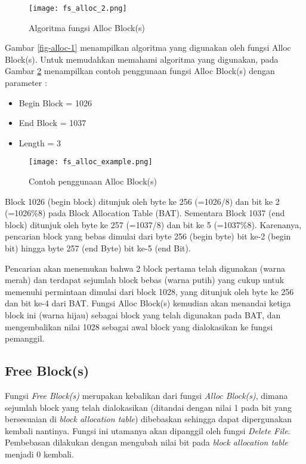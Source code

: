 \documentclass[a4paper, 12pt]{report}
\begin{document}
\begin{figure}
\centering
\texttt{[image: fs\_alloc\_2.png]}
\caption{Algoritma fungsi Alloc Block(s)}
\label{fig-alloc-2}
\end{figure}

Gambar \ref{fig-alloc-1} menampilkan algoritma yang digunakan oleh fungsi Alloc Block(s). Untuk memudahkan memahami algoritma yang digunakan, pada Gambar \ref{fig-alloc-example} menampilkan contoh penggunaan fungsi Alloc Block(s) dengan parameter : 
\begin{itemize}
\item Begin Block = 1026
\item End Block = 1037
\item Length = 3
\end{itemize}


\begin{figure}
\centering
\texttt{[image: fs\_alloc\_example.png]}
\caption{Contoh penggunaan Alloc Block(s)}
\label{fig-alloc-example}
\end{figure}

Block 1026 (begin block) ditunjuk oleh byte ke 256 (=1026/8) dan bit ke 2 (=1026\%8) pada Block Allocation Table (BAT). Sementara Block 1037 (end block) ditunjuk oleh byte ke 257 (=1037/8) dan bit ke 5 (=1037\%8). Karenanya, pencarian block yang bebas dimulai dari byte 256 (begin byte) bit ke-2 (begin bit) hingga byte 257 (end Byte) bit ke-5 (end Bit). 

Pencarian akan menemukan bahwa 2 block pertama telah digunakan (warna merah) dan terdapat sejumlah block bebas (warna putih) yang cukup untuk memenuhi permintaan dimulai dari block 1028, yang ditunjuk oleh byte ke 256 dan bit ke-4 dari BAT. Fungsi Alloc Block(s) kemudian akan menandai ketiga block ini (warna hijau) sebagai block yang telah digunakan pada BAT, dan mengembalikan nilai 1028 sebagai awal block yang dialokasikan ke fungsi pemanggil.


\subsection{Free Block(s)}

Fungsi {\em Free Block(s)} merupakan kebalikan dari fungsi {\em Alloc Block(s)}, dimana sejumlah block yang telah dialokasikan (ditandai dengan nilai 1 pada bit yang bersesuaian di {\em block allocation table}) dibebaskan sehingga dapat dipergunakan kembali nantinya. Fungsi ini utamanya akan dipanggil oleh fungsi {\em Delete File}. Pembebasan dilakukan dengan mengubah nilai bit pada {\em block allocation table} menjadi 0 kembali.
\end{document}
